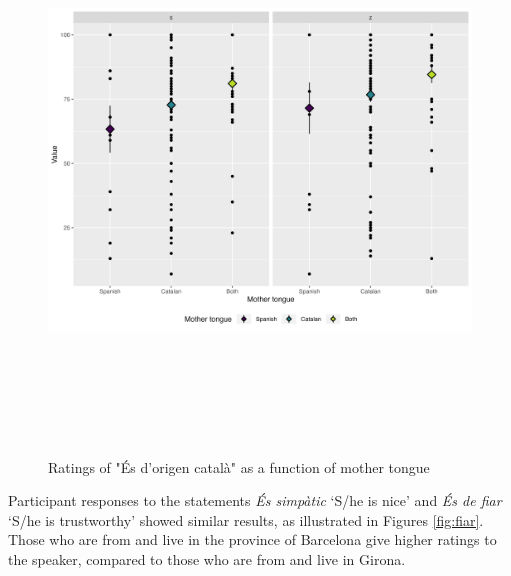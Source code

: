 \documentclass[
  a4paper,
  11pt,
  twocolumn]{article}
\begin{document}
\begin{figure}[!ht]
\begin{center}
\includegraphics[height=15cm]{./includes/figures/oc.png}
\caption{Ratings of "És d'origen català" as a function of mother tongue}\label{fig:oc}
\end{center}
\end{figure}

Participant responses to the statements \emph{És simpàtic} `S/he is
nice' and \emph{És de fiar} `S/he is trustworthy' showed similar
results, as illustrated in Figures \ref{fig:fiar}. Those who are from
and live in the province of Barcelona give higher ratings to the
speaker, compared to those who are from and live in Girona.
\end{document}
